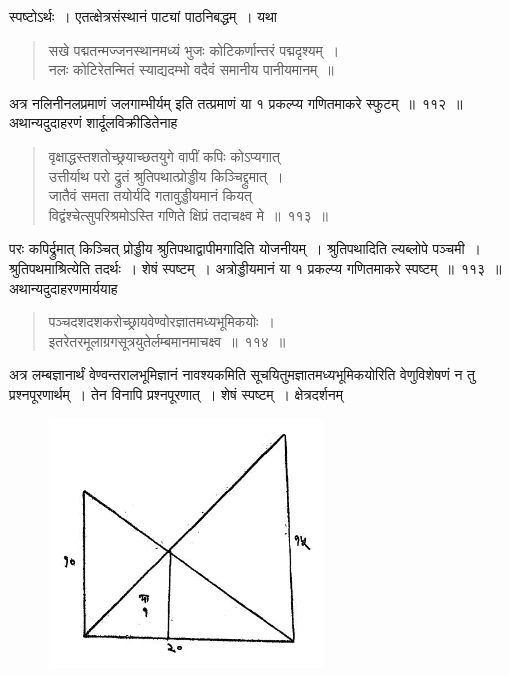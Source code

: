 \documentclass[11pt, openany]{book}
\begin{document}
 स्पष्टोऽर्थः~। एतत्क्षेत्रसंस्थानं पाट्यां पाठनिबद्धम्~। यथा\textendash
\begin{quote}
{\qt सखे पद्मतन्मज्जनस्थानमध्यं भुजः कोटिकर्णान्तरं पद्मदृश्यम्~। \\
 नलः कोटिरेतन्मितं स्याद्यदम्भो वदैवं समानीय पानीयमानम्~॥}
\end{quote}
 
 अत्र नलिनीनलप्रमाणं जलगाम्भीर्यम् इति तत्प्रमाणं या १ प्रकल्प्य गणितमाकरे स्फुटम्~॥~११२~॥~\\

\vspace{-2mm}
 अथान्यदुदाहरणं शार्दूलविक्रीडितेनाह\textendash
\begin{quote}
    \eg 
    वृक्षाद्धस्तशतोच्छ्रयाच्छतयुगे वापीं कपिः कोऽप्यगात् \\
 उत्तीर्याथ परो द्रुतं श्रुतिपथात्प्रोड्डीय किञ्चिद्द्रुमात्~। \\
 जातैवं समता तयोर्यदि गतावुड्डीयमानं कियत्\\
 विद्वंश्चेत्सुपरिश्रमोऽस्ति गणिते क्षिप्रं तदाचक्ष्व मे~॥~११३~॥~
\end{quote}
 
 परः कपिर्द्रुमात् किञ्चित् प्रोड्डीय श्रुतिपथाद्वापीमगादिति योजनीयम्~।
श्रुतिपथादिति 
ल्यब्लोपे पञ्चमी~। श्रुतिपथमाश्रित्येति तदर्थः~। शेषं स्पष्टम्~।
अत्रोड्डीयमानं या १ 
प्रकल्प्य गणितमाकरे स्पष्टम्~॥~११३~॥
\newpage
अथान्यदुदाहरणमार्ययाह\textendash
\begin{quote}
    \eg 
     पञ्चदशदशकरोच्छ्रायवेण्वोरज्ञातमध्यभूमिकयोः~। \\
 इतरेतरमूलाग्रगसूत्रयुतेर्लम्बमानमाचक्ष्व~॥~११४~॥~
\end{quote}

 अत्र लम्बज्ञानार्थं वेण्वन्तरालभूमिज्ञानं नावश्यकमिति सूचयितुमज्ञातमध्यभूमिकयोरिति वेणुविशेषणं न तु प्रश्नपूरणार्थम्~। तेन विनापि प्रश्नपूरणात्~। शेषं स्पष्टम्~। क्षेत्रदर्शनम्\textendash
\vspace{-2mm}
 
\begin{figure}[h!]
    \centering
    \includegraphics[scale=0.75]{graphics/Capture28.png}
\end{figure}
\vspace{-2mm}
\end{document}
